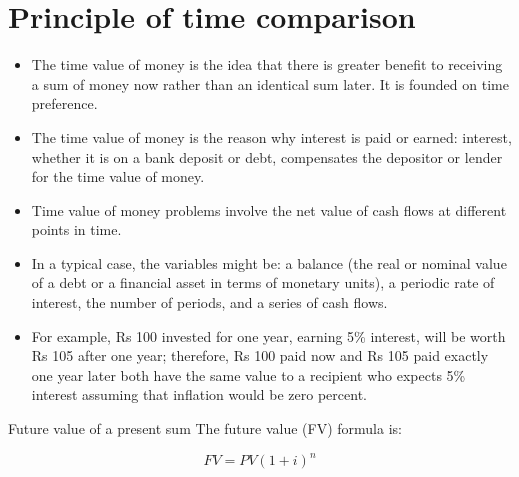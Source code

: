 \documentclass[12pt,ignorenonframetext,aspectratio=169]{beamer}
\providecommand{\tightlist}{%
  \setlength{\itemsep}{0pt}\setlength{\parskip}{0pt}}
\begin{document}
\hypertarget{principle-of-time-comparison}{%
\section{Principle of time
comparison}\label{principle-of-time-comparison}}

\begin{frame}{}
\protect\hypertarget{section-12}{}
\begin{itemize}
\tightlist
\item
  The time value of money is the idea that there is greater benefit to
  receiving a sum of money now rather than an identical sum later. It is
  founded on time preference.
\item
  The time value of money is the reason why interest is paid or earned:
  interest, whether it is on a bank deposit or debt, compensates the
  depositor or lender for the time value of money.
\end{itemize}
\end{frame}

\begin{frame}{}
\protect\hypertarget{section-13}{}
\begin{itemize}
\tightlist
\item
  Time value of money problems involve the net value of cash flows at
  different points in time.
\item
  In a typical case, the variables might be: a balance (the real or
  nominal value of a debt or a financial asset in terms of monetary
  units), a periodic rate of interest, the number of periods, and a
  series of cash flows.
\item
  For example, Rs 100 invested for one year, earning 5\% interest, will
  be worth Rs 105 after one year; therefore, Rs 100 paid now and Rs 105
  paid exactly one year later both have the same value to a recipient
  who expects 5\% interest assuming that inflation would be zero
  percent.
\end{itemize}
\end{frame}

\begin{frame}{Future value of a present sum}
\protect\hypertarget{future-value-of-a-present-sum}{}
The future value (FV) formula is:

\begin{equation}
FV = PV(1 + i)^n
\label{eqn:future-value}
\end{equation}
\end{frame}
\end{document}
